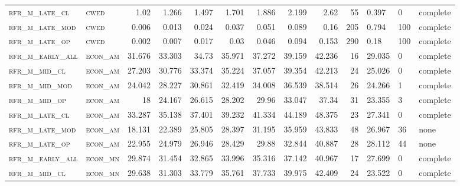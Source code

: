 \begin{landscape}
\begin{center}
\begin{longtable}{llrrrrr|rrr}
\textsc{rfr\_m\_late\_cl  } & \textsc{cwed      }   & 1.02    & 1.266   & 1.497   & 1.701    & 1.886    & 2.199    & 2.62     & 55     & 0.397         & 0             & complete           \\
\textsc{rfr\_m\_late\_mod } & \textsc{cwed      }   & 0.006   & 0.013   & 0.024   & 0.037    & 0.051    & 0.089    & 0.16     & 205    & 0.794         & 100           & complete       \\
\textsc{rfr\_m\_late\_op  } & \textsc{cwed      }   & 0.002   & 0.007   & 0.017   & 0.03     & 0.046    & 0.094    & 0.153    & 290    & 0.18          & 100           & complete       \\
\textsc{rfr\_m\_early\_all} & \textsc{econ\_am  }   & 31.676  & 33.303  & 34.73   & 35.971   & 37.272   & 39.159   & 42.236   & 16     & 29.035        & 0             & complete           \\
\textsc{rfr\_m\_mid\_cl   } & \textsc{econ\_am  }   & 27.203  & 30.776  & 33.374  & 35.224   & 37.057   & 39.354   & 42.213   & 24     & 25.026        & 0             & complete           \\
\textsc{rfr\_m\_mid\_mod  } & \textsc{econ\_am  }   & 24.042  & 28.227  & 30.861  & 32.419   & 34.008   & 36.539   & 38.514   & 26     & 24.266        & 1             & complete       \\
\textsc{rfr\_m\_mid\_op   } & \textsc{econ\_am  }   & 18      & 24.167  & 26.615  & 28.202   & 29.96    & 33.047   & 37.34    & 31     & 23.355        & 3             & complete       \\
\textsc{rfr\_m\_late\_cl  } & \textsc{econ\_am  }   & 33.287  & 35.138  & 37.401  & 39.232   & 41.334   & 44.189   & 48.375   & 23     & 27.341        & 0             & complete           \\
\textsc{rfr\_m\_late\_mod } & \textsc{econ\_am  }   & 18.131  & 22.389  & 25.805  & 28.397   & 31.195   & 35.959   & 43.833   & 48     & 26.967        & 36            & none       \\
\textsc{rfr\_m\_late\_op  } & \textsc{econ\_am  }   & 22.955  & 24.979  & 26.946  & 28.429   & 29.88    & 32.844   & 40.887   & 28     & 28.112        & 44            & none       \\
\textsc{rfr\_m\_early\_all} & \textsc{econ\_mn  }   & 29.874  & 31.454  & 32.865  & 33.996   & 35.316   & 37.142   & 40.967   & 17     & 27.699        & 0             & complete           \\
\textsc{rfr\_m\_mid\_cl   } & \textsc{econ\_mn  }   & 29.638  & 31.303  & 33.779  & 35.761   & 37.733   & 39.975   & 42.409   & 24     & 23.522        & 0             & complete           \\

\end{longtable}
\end{center}
\end{landscape}
